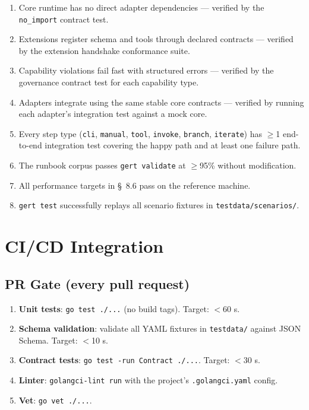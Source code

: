 \begin{enumerate}[label=\arabic*.]
  \item Core runtime has no direct adapter dependencies — verified by the \texttt{no\_import} contract test.
  \item Extensions register schema and tools through declared contracts — verified by the extension handshake conformance suite.
  \item Capability violations fail fast with structured errors — verified by the governance contract test for each capability type.
  \item Adapters integrate using the same stable core contracts — verified by running each adapter's integration test against a mock core.
  \item Every step type (\texttt{cli}, \texttt{manual}, \texttt{tool}, \texttt{invoke}, \texttt{branch}, \texttt{iterate}) has $\geq$1 end-to-end integration test covering the happy path and at least one failure path.
  \item The runbook corpus passes \texttt{gert validate} at $\geq$95\% without modification.
  \item All performance targets in \S~8.6 pass on the reference machine.
  \item \texttt{gert test} successfully replays all scenario fixtures in \texttt{testdata/scenarios/}.
\end{enumerate}

\section{CI/CD Integration}

\subsection{PR Gate (every pull request)}

\begin{enumerate}[label=\arabic*.]
  \item \textbf{Unit tests}: \texttt{go test ./...} (no build tags). Target: $<$60 s.
  \item \textbf{Schema validation}: validate all YAML fixtures in \texttt{testdata/} against JSON Schema. Target: $<$10 s.
  \item \textbf{Contract tests}: \texttt{go test -run Contract ./...}. Target: $<$30 s.
  \item \textbf{Linter}: \texttt{golangci-lint run} with the project's \texttt{.golangci.yaml} config.
  \item \textbf{Vet}: \texttt{go vet ./...}.
\end{enumerate}

